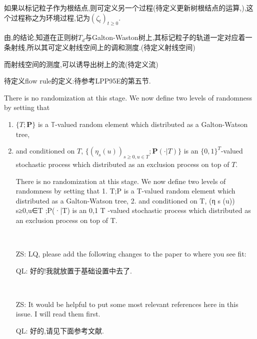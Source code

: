 \documentclass[a4paper,oneside]{ctexbook}
\begin{document}
			如果以标记粒子作为根结点,则可定义另一个过程(待定义更新树根结点的运算,),这个过程称之为环境过程,记为$(\zeta_t)_{t\ge0}$.

			由\cite{CCGS18},\cite{GS18}的结论,知道在正则树$T_d$与Galton-Waston树上,其标记粒子的轨道一定对应着一条射线,所以其可定义射线空间上的调和测度.(待定义射线空间)

			而射线空间的测度,可以诱导出树上的流(待定义流)

			待定义flow rule的定义:待参考LPP95E的第五节.

			
			
			There is no randomization at this stage. 
			We now define two levels of randomness by setting that 
			\begin{enumerate}
			\item
			$\{T; \mathbf P\}$ is a $\mathbb T$-valued random element which distributed as a Galton-Watson tree,
			\item
			and conditioned on $T$, $\{(\eta_s(u))_{s\geq 0,u \in T}; \mathbf P(\cdot| T)\}$ is an $\{0,1\}^{T}$-valued stochastic process which distributed as an exclusion process on top of $T$.

			There is no randomization at this stage. We now define two levels of randomness by
			setting that
			1. {T;P} is a T-valued random element which distributed as a Galton-Watson tree,
			2. and conditioned on T, {(η s (u)) s≥0,u∈T ;P(·|T)} is an {0,1} T -valued stochastic
			process which distributed as an exclusion process on top of T.
      

\end{enumerate}
	


	\begin{iss}[Open] ~
        \begin{itemize}
        \item[ZS:]
          LQ, please add the following changes to the paper to where you see fit:
        \item[QL:]
        	好的!我就放置于基础设置中去了.
        \end{itemize}
      \end{iss}


      \begin{iss}[Open]~
        \begin{itemize}
        \item[ZS:]
It would be helpful to put some most relevant references here in this issue.
I will read them first.
		\item[QL:]
			好的,请见下面参考文献.
        \end{itemize}
      \end{iss}
\end{document}
